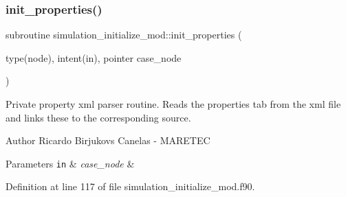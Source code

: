 \subsubsection{\texorpdfstring{init\+\_\+properties()}{init\_properties()}}
{\footnotesize\ttfamily subroutine simulation\+\_\+initialize\+\_\+mod\+::init\+\_\+properties (\begin{DoxyParamCaption}\item[{type(node), intent(in), pointer}]{case\+\_\+node }\end{DoxyParamCaption})\hspace{0.3cm}{\ttfamily [private]}}



Private property xml parser routine. Reads the properties tab from the xml file and links these to the corresponding source. 

\begin{DoxyAuthor}{Author}
Ricardo Birjukovs Canelas -\/ M\+A\+R\+E\+T\+EC 
\end{DoxyAuthor}

\begin{DoxyParams}[1]{Parameters}
\mbox{\tt in}  & {\em case\+\_\+node} & \\
\hline
\end{DoxyParams}


Definition at line 117 of file simulation\+\_\+initialize\+\_\+mod.\+f90.


